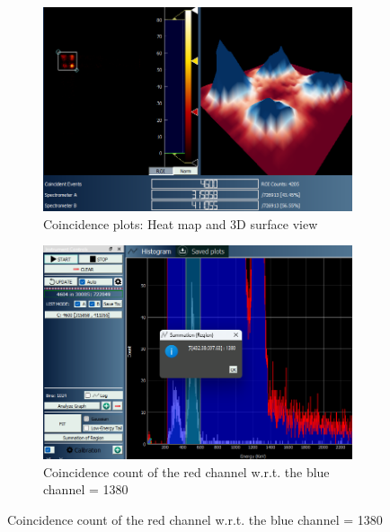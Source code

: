 \begin{figure}[H]
    \begin{subfigure}{\linewidth}
    \includegraphics[width=1\textwidth]{images/190/3d.png}
    \caption{Coincidence plots: Heat map and 3D surface view}
    \end{subfigure}
    
    \begin{subfigure}{\linewidth}
    \includegraphics[width=1\textwidth]{images/190/ccred.png}
    \caption{Coincidence count of the red channel w.r.t. the blue channel = 1380}
    \end{subfigure}

    

\end{figure}


